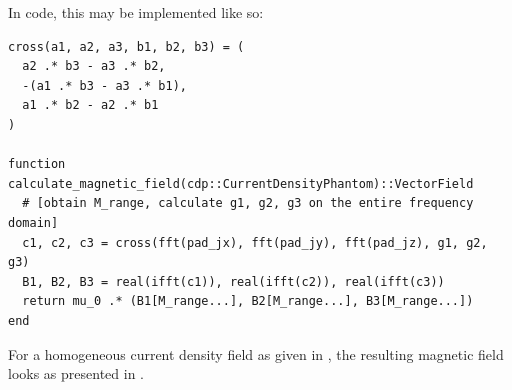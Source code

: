 \documentclass[10pt]{article}
\begin{document}
  In code, this may be implemented like so:
  \begin{verbatim}
cross(a1, a2, a3, b1, b2, b3) = (
  a2 .* b3 - a3 .* b2,
  -(a1 .* b3 - a3 .* b1),
  a1 .* b2 - a2 .* b1
)

function calculate_magnetic_field(cdp::CurrentDensityPhantom)::VectorField
  # [obtain M_range, calculate g1, g2, g3 on the entire frequency domain]
  c1, c2, c3 = cross(fft(pad_jx), fft(pad_jy), fft(pad_jz), g1, g2, g3)
  B1, B2, B3 = real(ifft(c1)), real(ifft(c2)), real(ifft(c3))
  return mu_0 .* (B1[M_range...], B2[M_range...], B3[M_range...])
end
  \end{verbatim}

  For a homogeneous current density field as given in , the resulting magnetic field looks as presented in .
\end{document}

